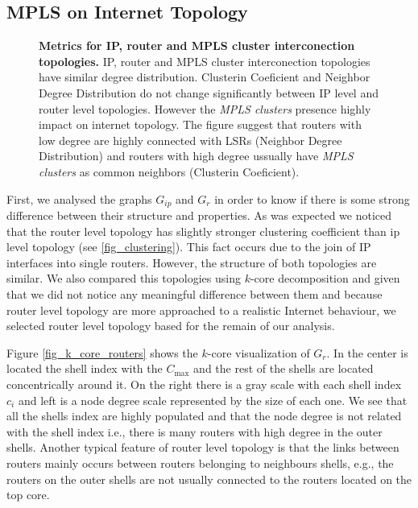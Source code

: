 \subsection{MPLS on Internet Topology}\label{cluster.topo}
\begin{figure*}[!htb]
  \begin{center}
    \hfil
    \hfil
  \end{center}
\caption{\textbf{Metrics for IP, router and MPLS cluster interconection topologies.} IP, router and MPLS cluster interconection topologies have similar degree distribution. Clusterin Coeficient and Neighbor Degree Distribution do not change significantly between IP level and router level topologies. However the \textit{MPLS clusters} presence highly impact on internet topology. The figure suggest that routers with low degree are highly connected with LSRs (Neighbor Degree Distribution) and routers with high degree ussually have \textit{MPLS clusters} as common neighbors (Clusterin Coeficient).} \label{fig_metrics}
\end{figure*}


First, we analysed the graphs $G_{ip}$ and $G_{r}$ in order to know if there is
some strong difference between their structure and properties. As was expected
we noticed that the router level topology has slightly stronger clustering coefficient than
ip level topology (see \ref{fig_clustering}). This fact occurs due to the join of IP interfaces into single
routers. However, the structure of both topologies are similar. We also
compared this topologies using $k$-core decomposition and given that we did not
notice any meaningful difference between them and because router level topology
are more approached to a realistic Internet behaviour, we selected router level topology based for the remain of our analysis.

Figure \ref{fig_k_core_routers} shows the $k$-core visualization of $G_{r}$. In
the center is located the shell index with the $C_{\max}$  and the rest of
the shells are located concentrically around it. On the right there is a gray scale
with each shell index $c_i$ and left is a node degree scale represented by the
size of each one. We see that all the shells index are highly populated and that
the node degree is not related with the shell index i.e., there is many routers
with high degree in the outer shells. Another typical feature of router level topology is that the links between routers mainly occurs between routers belonging to neighbours shells, e.g., the routers on the outer shells are not usually connected to the routers located on the top core. 

